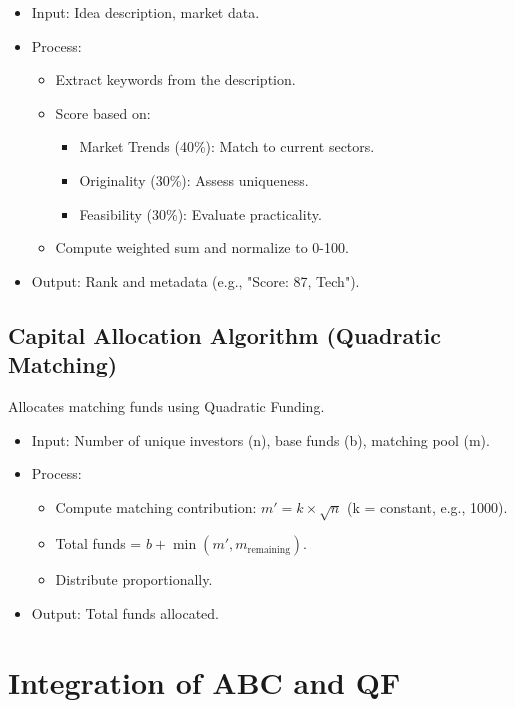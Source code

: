\documentclass[12pt]{article}
\begin{document}
\begin{itemize}
  \item Input: Idea description, market data.
  \item Process:
        \begin{itemize}
          \item Extract keywords from the description.
          \item Score based on:
                \begin{itemize}
                  \item Market Trends (40\%): Match to current sectors.
                  \item Originality (30\%): Assess uniqueness.
                  \item Feasibility (30\%): Evaluate practicality.
                \end{itemize}
          \item Compute weighted sum and normalize to 0-100.
        \end{itemize}
  \item Output: Rank and metadata (e.g., "Score: 87, Tech").
\end{itemize}

\subsection{Capital Allocation Algorithm (Quadratic Matching)}
Allocates matching funds using Quadratic Funding.

\begin{itemize}
  \item Input: Number of unique investors (n), base funds (b), matching pool (m).
  \item Process:
        \begin{itemize}
          \item Compute matching contribution: \( m' = k \times \sqrt{n} \) (k = constant, e.g., 1000).
          \item Total funds = \( b + \min(m', m_{\text{remaining}}) \).
          \item Distribute proportionally.
        \end{itemize}
  \item Output: Total funds allocated.
\end{itemize}

\section{Integration of ABC and QF}
\end{document}
